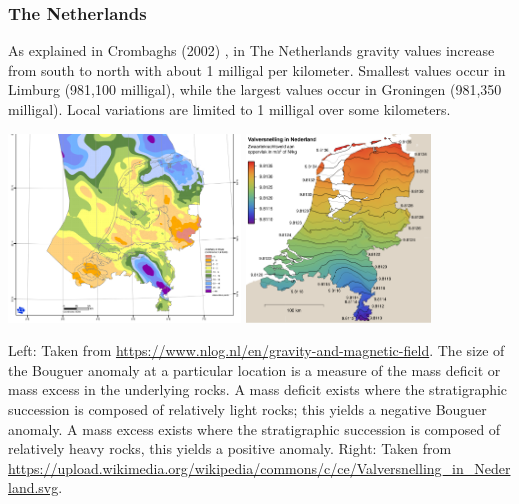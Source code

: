 \subsubsection{The Netherlands}

As explained in Crombaghs \etal (2002) \cite{crdv02},  
in The Netherlands gravity values
increase from south to north with about 1 milligal per kilometer. Smallest values occur
in Limburg (981,100 milligal), while the largest values occur in Groningen (981,350
milligal). Local variations are limited to 1 milligal over some kilometers.


\begin{center}
\includegraphics[height=5cm]{images/gravity/gravityNL}
\includegraphics[height=5cm]{images/gravity/gravityNL2}\\
{\captionfont Left: Taken from \url{https://www.nlog.nl/en/gravity-and-magnetic-field}. 
The size of the Bouguer anomaly at a particular location is a measure of the mass deficit or mass 
excess in the underlying rocks. A mass deficit  exists where  the stratigraphic succession is composed of relatively light rocks; 
this yields a negative Bouguer anomaly. A mass excess exists where the stratigraphic succession is 
composed of relatively heavy rocks, this yields a positive anomaly.
Right: Taken from \url{https://upload.wikimedia.org/wikipedia/commons/c/ce/Valversnelling_in_Nederland.svg}.

}
\end{center}

